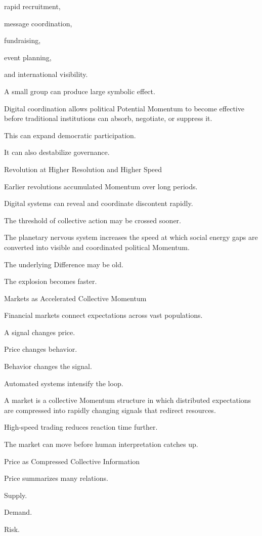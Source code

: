 rapid recruitment,

message coordination,

fundraising,

event planning,

and international visibility.

A small group can produce large symbolic effect.

Digital coordination allows political Potential Momentum to become effective before traditional institutions can absorb, negotiate, or suppress it.

This can expand democratic participation.

It can also destabilize governance.

Revolution at Higher Resolution and Higher Speed

Earlier revolutions accumulated Momentum over long periods.

Digital systems can reveal and coordinate discontent rapidly.

The threshold of collective action may be crossed sooner.

The planetary nervous system increases the speed at which social energy gaps are converted into visible and coordinated political Momentum.

The underlying Difference may be old.

The explosion becomes faster.

Markets as Accelerated Collective Momentum

Financial markets connect expectations across vast populations.

A signal changes price.

Price changes behavior.

Behavior changes the signal.

Automated systems intensify the loop.

A market is a collective Momentum structure in which distributed expectations are compressed into rapidly changing signals that redirect resources.

High-speed trading reduces reaction time further.

The market can move before human interpretation catches up.

Price as Compressed Collective Information

Price summarizes many relations.

Supply.

Demand.

Risk.

